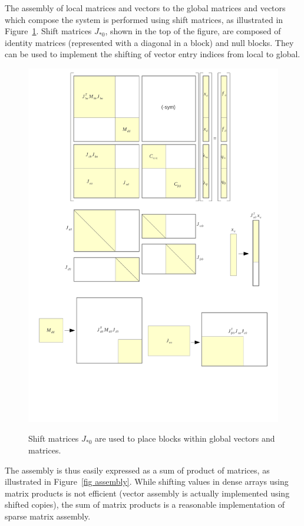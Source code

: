 The assembly of local matrices and vectors to the global matrices and vectors which compose the system is performed using shift matrices, as illustrated in Figure~\ref{fig shifting}.
Shift matrices $J_{*0}$, shown in the top of the figure, are composed of identity matrices (represented with a diagonal in a block) and null blocks. They can be used to implement the shifting of vector entry indices from local to global. 
\begin{figure}
\centering
 \includegraphics[clip,trim=0mm 40mm 0mm 115mm,width=0.89\linewidth]{system-bigmatrix.pdf}
\label{fig shifting}
\caption{Shift matrices $J_{*0}$ are used to place blocks within global vectors and matrices. }
\end{figure}
The assembly is thus easily expressed as a sum of product of matrices, as illustrated in Figure~\ref{fig assembly}. 
While shifting values in dense arrays using matrix products is not efficient (vector assembly is actually implemented using shifted copies), the sum of matrix products is a reasonable implementation of sparse matrix assembly.
